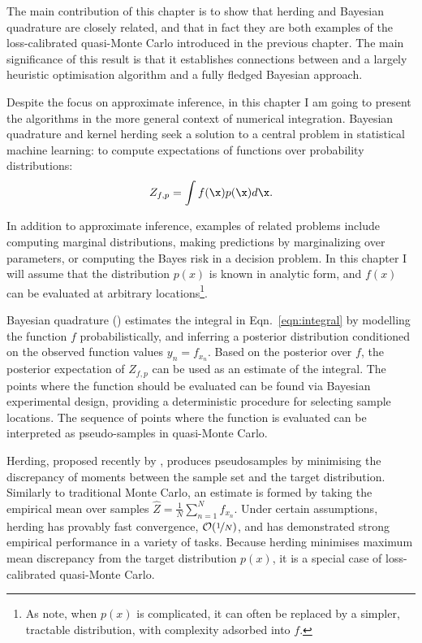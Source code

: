 The main contribution of this chapter is to show that herding and Bayesian quadrature are closely related, and that in fact they are both examples of the loss-calibrated quasi-Monte Carlo introduced in the previous chapter. The main significance of this result is that it establishes connections between and a largely heuristic optimisation algorithm and a fully fledged Bayesian approach.
\cbend

Despite the focus on approximate inference, in this chapter I am going to present the algorithms in the more general context of numerical integration. Bayesian quadrature and kernel herding seek a solution to a central problem in statistical machine learning: to compute expectations of functions over probability distributions:
%
\begin{equation}
	Z_{f,p} = \int f(\x) p(\x) d\x. \label{eqn:integral}
\end{equation}

In addition to approximate inference, examples of related problems include computing marginal distributions, making predictions by marginalizing over parameters, or computing the Bayes risk in a decision problem. In this chapter I will assume that the distribution $p(x)$ is known in analytic form, and $f(x)$ can be evaluated at arbitrary locations\footnote{As \citet{BZMonteCarlo} note, when $p(x)$ is complicated, it can often be replaced by a simpler, tractable distribution, with complexity adsorbed into $f$.}.

Bayesian quadrature (\bq{}) estimates the integral in Eqn.\ \eqref{eqn:integral} by modelling the function $f$ probabilistically, and inferring a posterior distribution conditioned on the observed function values $y_n = f_{x_n}$. Based on the posterior over $f$, the posterior expectation of $Z_{f,p}$ can be used as an estimate of the integral. The points where the function should be evaluated can be found via Bayesian experimental design, providing a deterministic procedure for selecting sample locations. The sequence of points where the function is evaluated can be interpreted as pseudo-samples in quasi-Monte Carlo.

Herding, proposed recently by \cite{Chen2010}, produces pseudosamples by minimising the discrepancy of moments between the sample set and the target distribution. Similarly to traditional Monte Carlo, an estimate is formed by taking the empirical mean over samples $\hat{Z} = \frac{1}{N}\sum_{n=1}^{N}f_{x_n}$. Under certain assumptions, herding has provably fast convergence, $\mathcal{O}(\nicefrac{1}{N})$, and has demonstrated strong empirical performance in a variety of tasks. Because herding minimises maximum mean discrepancy from the target distribution $p(x)$, it is a special case of loss-calibrated quasi-Monte Carlo.

